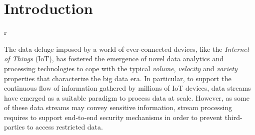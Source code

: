 \section{Introduction}r\label{sec:introduction}

The data deluge imposed by a world of ever-connected devices, like the \emph{Internet of Things} (IoT), has fostered the emergence of novel data analytics and processing technologies to cope with the typical \emph{volume}, \emph{velocity} and \emph{variety} properties that characterize the big data era.
In particular, to support the continuous flow of information gathered by millions of IoT devices, data streams have emerged as a suitable paradigm to process data at scale.
However, as some of these data streams may convey sensitive information, stream processing requires to support end-to-end security mechanisms in order to prevent third-parties to access restricted data.

